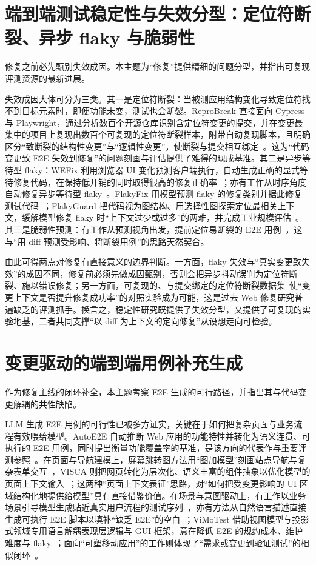 \documentclass[11pt,a4paper]{article}
\begin{document}
\section{端到端测试稳定性与失效分型：定位符断裂、异步 flaky 与脆弱性}

修复之前必先甄别失效成因。本主题为“修复”提供精细的问题分型，并指出可复现评测资源的最新进展。

失效成因大体可分为三类。其一是定位符断裂：当被测应用结构变化导致定位符找不到目标元素时，即便功能未变，测试也会断裂。ReproBreak 直接面向 Cypress 与 Playwright，通过分析数百个开源仓库识别含定位符变更的提交，并在变更最集中的项目上复现出数百个可复现的定位符断裂样本，附带自动复现脚本，且明确区分“致断裂的结构性变更”与“逻辑性变更”，使断裂与提交相互绑定~\cite{reprobreak}。这为“代码变更致 E2E 失效到修复”的问题刻画与评估提供了难得的现成基准。其二是异步等待型 flaky：WEFix 利用浏览器 UI 变化预测客户端执行，自动生成正确的显式等待修复代码，在保持低开销的同时取得很高的修复正确率~\cite{wefix}；亦有工作从时序角度自动修复异步等待型 flaky~\cite{timebasedrepair}。FlakyFix 用模型预测 flaky 的修复类别并据此修复测试代码~\cite{flakyfix}；FlakyGuard 把代码视为图结构、用选择性图探索定位最相关上下文，缓解模型修复 flaky 时“上下文过少或过多”的两难，并完成工业规模评估~\cite{flakyguard}。其三是脆弱性预测：有工作从预测视角出发，提前定位易断裂的 E2E 用例~\cite{fragility}，这与“用 diff 预测受影响、将断裂用例”的思路天然契合。

由此可得两点对修复有直接意义的边界判断。一方面，flaky 失效与“真实变更致失效”的成因不同，修复前必须先做成因甄别，否则会把异步抖动误判为定位符断裂、施以错误修复；另一方面，可复现的、与提交绑定的定位符断裂数据集~\cite{reprobreak}使“变更上下文是否提升修复成功率”的对照实验成为可能，这是过去 Web 修复研究普遍缺乏的评测抓手。换言之，稳定性研究既提供了失效分型，又提供了可复现的实验地基，二者共同支撑“以 diff 为上下文的定向修复”从设想走向可检验。

\section{变更驱动的端到端用例补充生成}

作为修复主线的闭环补全，本主题考察 E2E 生成的可行路径，并指出其与代码变更解耦的共性缺陷。

LLM 生成 E2E 用例的可行性已被多方证实，关键在于如何把复杂页面与业务流程有效喂给模型。AutoE2E 自动推断 Web 应用的功能特性并转化为语义连贯、可执行的 E2E 用例，同时提出衡量功能覆盖率的基准，是该方向的代表作与重要评测参照~\cite{autoe2e}。在页面与导航建模上，屏幕跳转图方法用“图加模型”刻画站点导航与复杂表单交互~\cite{screentransition}，VISCA 则把网页转化为层次化、语义丰富的组件抽象以优化模型的页面上下文输入~\cite{visca}；这两种“页面上下文表征”思路，对“如何把受变更影响的 UI 区域结构化地提供给模型”具有直接借鉴价值。在场景与意图驱动上，有工作以业务场景引导模型生成贴近真实用户流程的测试序列~\cite{scenarioguided}，亦有方法从自然语言描述直接生成可执行 E2E 脚本以填补“缺乏 E2E”的空白~\cite{geniae2e}；ViMoTest 借助视图模型与投影式领域专用语言解耦表现层逻辑与 GUI 框架，意在降低 E2E 的规约成本、维护难度与 flaky~\cite{vimotest}；面向“可塑移动应用”的工作则体现了“需求或变更到验证测试”的相似闭环~\cite{malleablemobile}。
\end{document}
